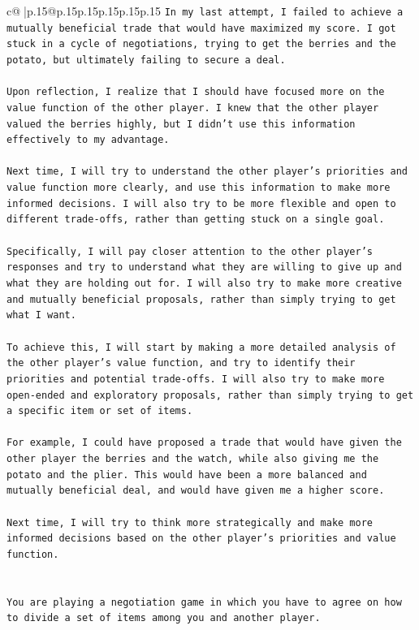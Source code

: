 \documentclass{article}
\begin{document}
{\begin{supertabular}{c@{$\;$}|p{.15\linewidth}@{}p{.15\linewidth}p{.15\linewidth}p{.15\linewidth}p{.15\linewidth}p{.15\linewidth}}
{{{\texttt{In my last attempt, I failed to achieve a mutually beneficial trade that would have maximized my score. I got stuck in a cycle of negotiations, trying to get the berries and the potato, but ultimately failing to secure a deal. } \\
\\ 
\texttt{Upon reflection, I realize that I should have focused more on the value function of the other player. I knew that the other player valued the berries highly, but I didn't use this information effectively to my advantage. } \\
\\ 
\texttt{Next time, I will try to understand the other player's priorities and value function more clearly, and use this information to make more informed decisions. I will also try to be more flexible and open to different trade{-}offs, rather than getting stuck on a single goal. } \\
\\ 
\texttt{Specifically, I will pay closer attention to the other player's responses and try to understand what they are willing to give up and what they are holding out for. I will also try to make more creative and mutually beneficial proposals, rather than simply trying to get what I want. } \\
\\ 
\texttt{To achieve this, I will start by making a more detailed analysis of the other player's value function, and try to identify their priorities and potential trade{-}offs. I will also try to make more open{-}ended and exploratory proposals, rather than simply trying to get a specific item or set of items. } \\
\\ 
\texttt{For example, I could have proposed a trade that would have given the other player the berries and the watch, while also giving me the potato and the plier. This would have been a more balanced and mutually beneficial deal, and would have given me a higher score. } \\
\\ 
\texttt{Next time, I will try to think more strategically and make more informed decisions based on the other player's priorities and value function.} \\
\\ 
\\ 
\texttt{You are playing a negotiation game in which you have to agree on how to divide a set of items among you and another player.} \\
}}}
\end{supertabular}}
\end{document}
